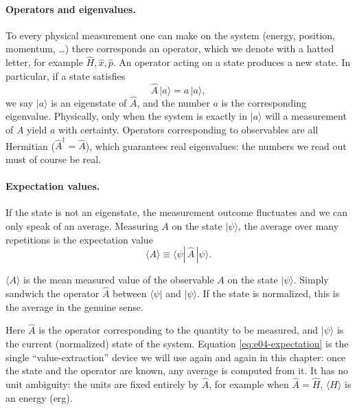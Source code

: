 \paragraph{Operators and eigenvalues.}
To every physical measurement one can make on the system (energy, position, momentum, \ldots) there corresponds an operator, which we denote with a hatted letter, for example \(\hat H,\hat x,\hat p\). An operator acting on a state produces a new state. In particular, if a state satisfies
\[
  \hat A\,|a\rangle = a\,|a\rangle,
\]
we say \(|a\rangle\) is an eigenstate of \(\hat A\), and the number \(a\) is the corresponding eigenvalue. Physically, only when the system is exactly in \(|a\rangle\) will a measurement of \(A\) yield \(a\) with certainty. Operators corresponding to observables are all Hermitian (\(\hat A^\dagger=\hat A\)), which guarantees real eigenvalues: the numbers we read out must of course be real.

\paragraph{Expectation values.}
If the state is not an eigenstate, the measurement outcome fluctuates and we can only speak of an average. Measuring \(A\) on the state \(|\psi\rangle\), the average over many repetitions is the expectation value
\begin{equation}
  \langle A\rangle \equiv \langle\psi|\,\hat A\,|\psi\rangle .
  \label{eq:e04-expectation}
\end{equation}
\begin{formulaexplain}
\(\langle A\rangle\) is the mean measured value of the observable \(A\) on the state \(|\psi\rangle\). Simply sandwich the operator \(\hat A\) between \(\langle\psi|\) and \(|\psi\rangle\). If the state is normalized, this is the average in the genuine sense.
\end{formulaexplain}
Here \(\hat A\) is the operator corresponding to the quantity to be measured, and \(|\psi\rangle\) is the current (normalized) state of the system. Equation \eqref{eq:e04-expectation} is the single ``value-extraction'' device we will use again and again in this chapter: once the state and the operator are known, any average is computed from it. It has no unit ambiguity: the units are fixed entirely by \(\hat A\), for example when \(\hat A=\hat H\), \(\langle H\rangle\) is an energy (erg).

